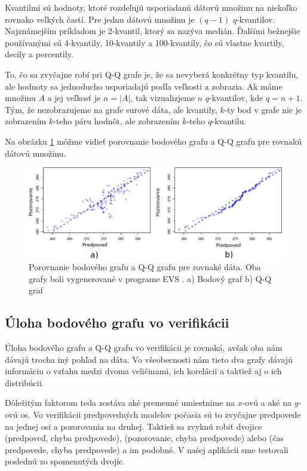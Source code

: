 Kvantilmi sú hodnoty, ktoré rozdeľujú usporiadanú dátovú množinu na niekoľko rovnako veľkých častí. Pre jednu dátovú množinu je $ (q - 1) $ $ q $-kvantilov. Najznámejším príkladom je \mbox{2-kvantil}, ktorý sa nazýva medián. Ďalšími bežnejšie používanými sú \mbox{4-kvantily}, \mbox{10-kvantily} a \mbox{100-kvantily}, čo sú vlastne kvartily, decily a percentily. 

To, čo sa zvyčajne robí pri \mbox{Q-Q} grafe je, že sa nevyberá konkrétny typ kvantilu, ale hodnoty sa jednoducho usporiadajú podľa veľkosti a zobrazia. Ak máme množinu $ A $ a jej veľkosť je $ n = \lvert A \rvert $, tak vizualizjeme $ n $ \mbox{$ q $-kvantilov}, kde $ q = n + 1 $.  Tým, že nezobrazujeme na grafe surové dáta, ale kvantily, \mbox{$ k $-ty} bod v grafe nie je zobrazením \mbox{$ k $-teho} páru hodnôt, ale zobrazením \mbox{$ k $-teho} \mbox{$ q $-kvantilu}. 

Na obrázku \ref{fig:scattervsqq} môžme vidieť porovnanie bodového grafu a \mbox{Q-Q} grafu pre rovnakú dátovú množinu.


\begin{figure}
	\centering
	\includegraphics[width = 5.5in]{scattervsqq}
	\caption{Porovnanie bodového grafu a Q-Q grafu pre rovnaké dáta. Oba grafy boli vygenerované v programe EVS \cite{EVS}. a) Bodový graf b) Q-Q graf }
	\label{fig:scattervsqq}
\end{figure}

\subsection{Úloha bodového grafu vo verifikácii}
Úloha bodového grafu a \mbox{Q-Q} grafu vo verifikácii je rovnaká, avšak oba nám dávajú trocha iný pohľad na dáta. Vo všeobecnosti nám tieto dva grafy dávajú informáciu o vzťahu medzi dvoma veličinami, ich korelácii a taktiež aj o ich distribúcii. 

Dôležitým faktorom teda zostáva aké premenné umiestnime na \mbox{$ x $-ovú} a aké na \mbox{$ y $-ovú} os. Vo verifikácii predpovedných modelov počasia sú to zvyčajne predpovede na jednej osi a pozorovania na druhej. Taktiež sa zvyknú robiť dvojice (predpoveď, chyba predpovede), (pozorovanie, chyba predpovede) alebo (čas predpovede, chyba predpovede) a im podobné. V našej aplikácii sme testovali poslednú zo spomenutých dvojíc.


